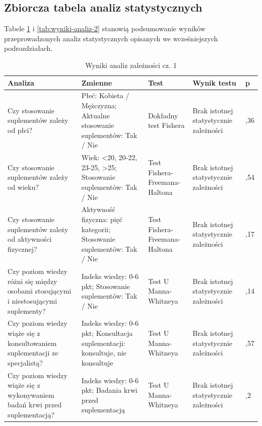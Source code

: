 \subsection{Zbiorcza tabela analiz statystycznych}


Tabele \ref{tab:wyniki-analiz-1} i \ref{tab:wyniki-analiz-2} stanowią podsumowanie wyników przeprowadzonych analiz statystycznych opisanych we wcześniejszych podrozdziałach.

\begin{table}[H]
    \centering
    \renewcommand{\arraystretch}{1,3}%
    \caption{Wyniki analiz zależności cz. 1}
    \label{tab:wyniki-analiz-1}
    \begin{tabularx}{\textwidth}{|X|X|
        >{\centering\arraybackslash}p{2cm}|
        >{\centering\arraybackslash}p{}|
        >{\centering\arraybackslash}p{}|}
        \hline
        \textbf{Analiza} & \textbf{Zmienne} & \textbf{Test} & \textbf{Wynik testu} & \textbf{p} \\
        \hline
        \hline
        Czy stosowanie suplementów zależy od płci? &
        Płeć: Kobieta / Mężczyzna; Aktualne stosowanie suplementów: Tak / Nie &
        Dokładny test Fishera &
        Brak istotnej statystycznie zależności &
        0,36 \\
        \hline
        Czy stosowanie suplementów zależy od wieku? & 
        Wiek: <20, 20-22, 23-25, >25; Stosowanie suplementów: Tak / Nie &
        Test Fishera-Freemana-Haltona &
        Brak istotnej statystycznie zależności & 
        0,54 \\
        \hline
        Czy stosowanie suplementów zależy od aktywności fizycznej? &
        Aktywność fizyczna: pięć kategorii; Stosowanie suplementów: Tak / Nie &
        Test Fishera-Freemana-Haltona &
        Brak istotnej statystycznie zależności & 
        0,17 \\
        \hline
        Czy poziom wiedzy różni się między osobami stosującymi i niestosującymi suplementy? & 
        Indeks wiedzy: 0-6 pkt; Stosowanie suplementów: Tak / Nie &
        Test U Manna-Whitneya &
        Brak istotnej statystycznie zależności & 
        0,14 \\
        \hline
        Czy poziom wiedzy wiąże się z konsultowaniem suplementacji ze specjalistą? & 
        Indeks wiedzy: 0-6 pkt; Konsultacja suplementacji: konsultuje, nie konsultuje &
        Test U Manna-Whitneya &
        Brak istotnej statystycznie zależności & 
        0,57  \\
        \hline
        Czy poziom wiedzy wiąże się z wykonywaniem badań krwi przed suplementacją? & 
        Indeks wiedzy: 0-6 pkt; Badania krwi przed suplementacją &
        Test U Manna-Whitneya &
        Brak istotnej statystycznie zależności & 
        0,2  \\
        \hline
    \end{tabularx}
\end{table}

